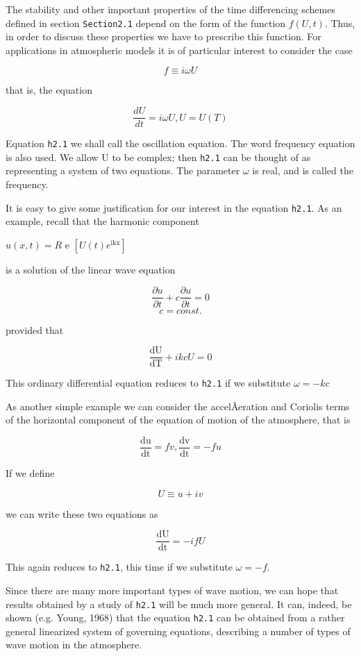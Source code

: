 The stability and other important properties of the time differencing
schemes defined in section \texttt{Section2.1} depend on the form of the
function \(f\left( U,t \right)\). Thus, in order to discuss these
properties we have to prescribe this function. For applications in
atmospheric models it is of particular interest to consider the case

\[f \equiv i\omega U\]

that is, the equation

{\[\frac{dU}{dt} = i\omega U, U = U\left( T \right)\]}

Equation \texttt{h2.1} we shall call the oscillation equation. The word
frequency equation is also used. We allow U to be complex; then
\texttt{h2.1} can be thought of as representing a system of two
equations. The parameter \(\omega\) is real, and is called the
frequency.

It is easy to give some justification for our interest in the equation
\texttt{h2.1}. As an example, recall that the harmonic component

\(u\left( x,t \right) = R\) e
\(\left\lbrack U\left( t \right)e^{\text{ikx}} \right\rbrack\)

is a solution of the linear wave equation

\[\frac{\partial u}{\partial t} + c\frac{\partial u}{\partial t} = 0\]\[c = const.\]

provided that

\[\frac{\text{dU}}{\text{dT}} + ikcU = 0\]

This ordinary differential equation reduces to \texttt{h2.1} if we
substitute \(\omega = - kc\)

As another simple example we can consider the accelÂ­eration and Coriolis
terms of the horizontal component of the equation of motion of the
atmosphere, that is

\[\frac{\text{du}}{\text{dt}} = fv,\frac{\text{dv}}{\text{dt}} = - fu\]

If we define

\[U \equiv u + iv\]

we can write these two equations as

\[\frac{\text{dU}}{\text{dt}} = - ifU\]

This again reduces to \texttt{h2.1}, this time if we substitute
\(\omega = - f\).

Since there are many more important types of wave motion, we can hope
that results obtained by a study of \texttt{h2.1} will be much more
general. It can, indeed, be shown (e.g. Young, 1968) that the equation
\texttt{h2.1} can be obtained from a rather general linearized system of
governing equations, describing a number of types of wave motion in the
atmosphere.

